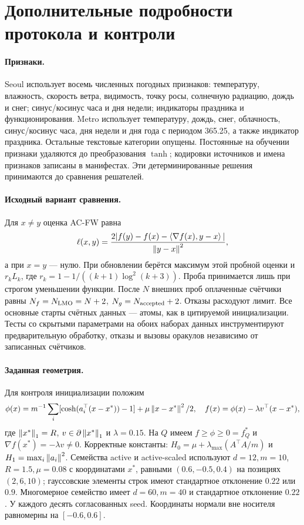 \section{Дополнительные подробности протокола и контроли}
\label{app:protocol}
\paragraph{Признаки.}
Seoul использует восемь численных погодных признаков: температуру,
влажность, скорость ветра, видимость, точку росы, солнечную радиацию,
дождь и снег; синус/косинус часа и дня недели; индикаторы праздника
и функционирования. Metro использует температуру, дождь, снег,
облачность, синус/косинус часа, дня недели и дня года с периодом
365.25, а также индикатор праздника. Остальные текстовые категории
опущены. Постоянные на обучении признаки удаляются до преобразования
$\tanh$; кодировки источников и имена признаков записаны в манифестах.
Эти детерминированные решения принимаются до сравнения решателей.

\paragraph{Исходный вариант сравнения.}
Для $x\ne y$ оценка AC-FW равна
\[
 \ell(x,y)=\frac{2|f(y)-f(x)-\left\langle\nabla f(x),y-x\right\rangle|}{\left\|y-x\right\|^2},
\]
а при $x=y$ — нулю. При обновлении берётся максимум этой пробной
оценки и $r_kL_k$, где $r_k=1-1/((k+1)\log^2(k+3))$.
Проба принимается лишь при строгом уменьшении функции.
После $N$ внешних проб оплаченные счётчики равны
$N_f=N_{\rm LMO}=N+2$, $N_g=N_{\rm accepted}+2$.
Отказы расходуют лимит. Все основные старты счётных данных — атомы,
как в цитируемой инициализации. Тесты со скрытыми параметрами на
обоих наборах данных инструментируют предварительную обработку,
отказы и вызовы оракулов независимо от записанных счётчиков.

\paragraph{Заданная геометрия.}
Для контроля инициализации положим
\[
 \phi(x)=m^{-1}\sum_i[\cosh(a_i^\top(x-x^*))-1]
                         +\mu\left\|x-x^*\right\|^2/2,
 \quad f(x)=\phi(x)-\lambda v^\top(x-x^*),
\]
где $\left\|x^*\right\|_1=R$, $v\in\partial\left\|x^*\right\|_1$ и
$\lambda=0.15$. На $Q$ имеем $f\ge\phi\ge0=f_Q^*$ и
$\nabla f(x^*)=-\lambda v\ne0$. Корректные константы:
$H_0=\mu+\lambda_{\max}(A^\top A/m)$ и
$H_1=\max_i\left\|a_i\right\|^2$.
Семейства active и active-scaled используют $d=12,m=10$,
$R=1.5,\mu=0.08$ с координатами $x^*$, равными $(0.6,-0.5,0.4)$
на позициях $(2,6,10)$; гауссовские элементы строк имеют стандартное
отклонение $0.22$ или $0.9$. Многомерное семейство имеет $d=60,m=40$
и стандартное отклонение $0.22$. У каждого десять согласованных seed.
Координаты нормали вне носителя равномерны на $[-0.6,0.6]$.

